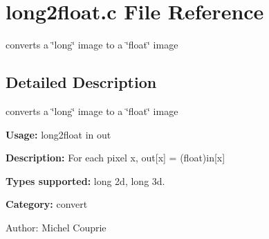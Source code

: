 \section{long2float.c File Reference}
\label{long2float_8c}
converts a \char`\"{}long\char`\"{} image to a \char`\"{}float\char`\"{} image 



\subsection{Detailed Description}
converts a \char`\"{}long\char`\"{} image to a \char`\"{}float\char`\"{} image 

{\bf Usage:} long2float in out

{\bf Description:} For each pixel x, out[x] = (float)in[x]

{\bf Types supported:} long 2d, long 3d.

{\bf Category:} convert

\begin{Desc}
\item[Author:]Michel Couprie \end{Desc}
